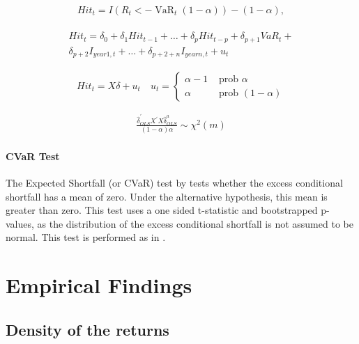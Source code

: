 \documentclass[a4paper, nobind]{templates/ociamthesis}
\begin{document}
\begin{align}
Hit_{t}=I\left(R_{t}<-\operatorname{VaR}_{t}(1-\alpha)\right)-(1-\alpha),
\label{eq:dq1}
\end{align}
\vspace{-20mm}

\begin{align}
\begin{array}{c}
Hit_{t}=\delta_{0}+\delta_{1} H i t_{t-1}+\ldots+\delta_{p} Hit_{t-p}+\delta_{p+1} VaR_{t}+ \\
\delta_{p+2} I_{year1, t}+\ldots+\delta_{p+2+n} I_{year n, t}+u_{t} \end{array}
\label{eq:dq2}
\end{align}
\vspace{-15mm}

\[Hit_{t}=X \delta+u_{t} \quad u_{t}=\left\{\begin{array}{ll}
\alpha-1 & \text { prob }\alpha \\
\alpha & \text { prob } (1-\alpha)
\end{array}\right.\]

\vspace{-5mm}
\begin{align}
\frac{\hat{\delta}_{O L S}^{\prime} X^{\prime} X \hat{\delta}_{O L S}^{a}}{(1-\alpha)\alpha} \sim \chi^{2}(m)
\label{eq:dq3}
\end{align}

\hypertarget{cvar-test}{%
\subsubsection{CVaR Test}\label{cvar-test}}

\noindent The Expected Shortfall (or CVaR) test by \textcite{mcneil2000} tests whether the excess conditional shortfall has a mean of zero. Under the alternative hypothesis, this mean is greater than zero. This test uses a one sided t-statistic and bootstrapped p-values, as the distribution of the excess conditional shortfall is not assumed to be normal. This test is performed as in \textcite{ardia2019}.

\hypertarget{analysis}{%
\chapter{Empirical Findings}\label{analysis}}

\minitoc 

\hypertarget{density-of-the-returns}{%
\section{Density of the returns}\label{density-of-the-returns}}
\end{document}
